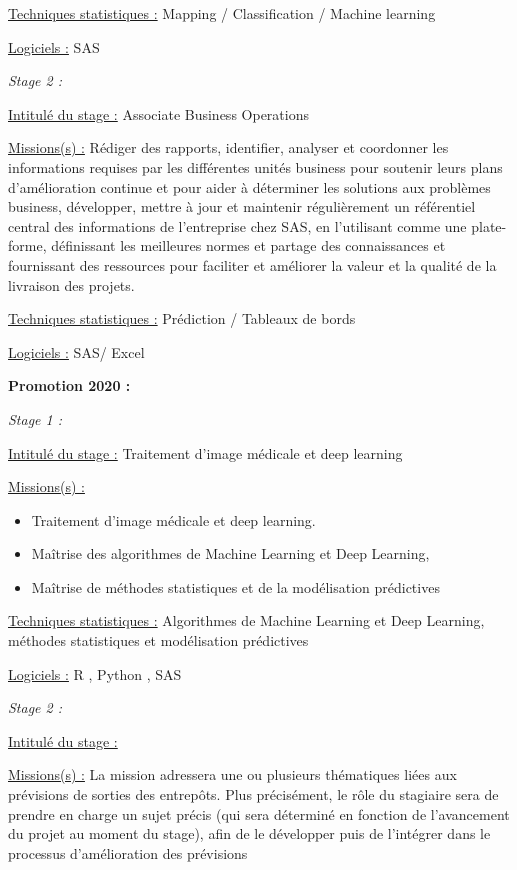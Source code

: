 \documentclass[
  letterpaper,
  DIV=11,
  numbers=noendperiod]{scrreprt}
\begin{document}
\uline{Techniques statistiques :} Mapping / Classification / Machine
learning

\uline{Logiciels :} SAS

\emph{Stage 2 :}

\uline{Intitulé du stage :} Associate Business Operations

\uline{Missions(s) :} Rédiger des rapports, identifier, analyser et
coordonner les informations requises par les différentes unités business
pour soutenir leurs plans d'amélioration continue et pour aider à
déterminer les solutions aux problèmes business, développer, mettre à
jour et maintenir régulièrement un référentiel central des informations
de l'entreprise chez SAS, en l'utilisant comme une plate-forme,
définissant les meilleures normes et partage des connaissances et
fournissant des ressources pour faciliter et améliorer la valeur et la
qualité de la livraison des projets.

\uline{Techniques statistiques :} Prédiction / Tableaux de bords

\uline{Logiciels :} SAS/ Excel

\textbf{Promotion 2020 :}

\emph{Stage 1 :}

\uline{Intitulé du stage :} Traitement d'image médicale et deep learning

\uline{Missions(s) :}

\begin{itemize}
\item
  Traitement d'image médicale et deep learning.
\item
  Maîtrise des algorithmes de Machine Learning et Deep Learning,
\item
  Maîtrise de méthodes statistiques et de la modélisation prédictives
\end{itemize}

\uline{Techniques statistiques :} Algorithmes de Machine Learning et
Deep Learning, méthodes statistiques et modélisation prédictives

\uline{Logiciels :} R , Python , SAS

\emph{Stage 2 :}

\uline{Intitulé du stage :}

\uline{Missions(s) :} La mission adressera une ou plusieurs thématiques
liées aux prévisions de sorties des entrepôts. Plus précisément, le rôle
du stagiaire sera de prendre en charge un sujet précis (qui sera
déterminé en fonction de l'avancement du projet au moment du stage),
afin de le développer puis de l'intégrer dans le processus
d'amélioration des prévisions
\end{document}
